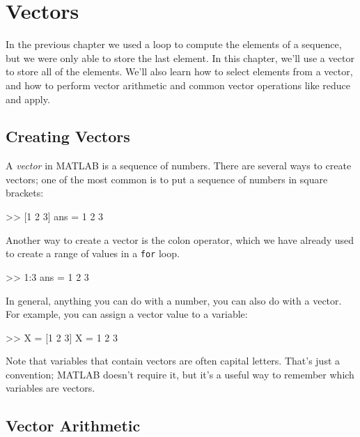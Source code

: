\chapter{Vectors}
\label{vectors}

In the previous chapter we used a loop to compute the elements of a sequence, but we were only able to store the last element.  In this chapter, we'll use a vector to store all of the elements.
We'll also learn how to select elements from a vector, and how to perform vector arithmetic and common vector operations like reduce and apply.


\section{Creating Vectors}


A \emph{vector} in MATLAB is a sequence of numbers.
There are several ways to create vectors; one of the most common is
to put a sequence of numbers in square brackets:

\begin{code}
>> [1 2 3]
ans = 1     2     3
\end{code}

Another way to create a vector is the colon operator, which we have already used to create a range of values in a {\tt for} loop.

\begin{code}
>> 1:3
ans = 1     2     3
\end{code}

In general, anything you can do with a number, you can also do with
a vector.  For example, you can assign a vector value to a variable:

\begin{code}
>> X = [1 2 3]
X = 1     2     3
\end{code}

Note that variables that contain vectors are often capital letters.
That's just a convention; MATLAB doesn't require it, but it's a useful way to remember which variables are vectors.


\section{Vector Arithmetic}
\label{elementwise}


